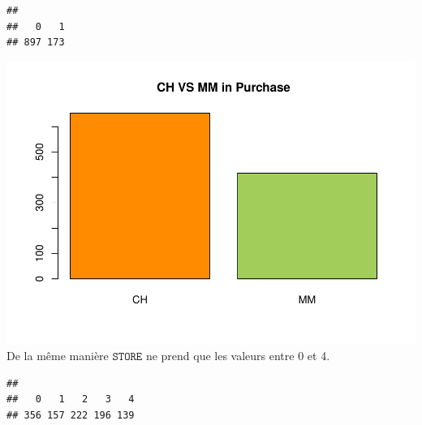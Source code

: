 \documentclass[]{article}
\newenvironment{Shaded}{\begin{snugshade}}{\end{snugshade}}
\newcommand{\KeywordTok}[1]{\textcolor[rgb]{0.13,0.29,0.53}{\textbf{#1}}}
\newcommand{\NormalTok}[1]{#1}
\newcommand{\OperatorTok}[1]{\textcolor[rgb]{0.81,0.36,0.00}{\textbf{#1}}}
\begin{document}
\begin{verbatim}
## 
##   0   1 
## 897 173
\end{verbatim}

\begin{Shaded}
\end{Shaded}

\includegraphics{durand_eltarr_files/figure-latex/unnamed-chunk-4-1.pdf}
De la même manière \(\texttt{STORE}\) ne prend que les valeurs entre 0
et 4.

\begin{Shaded}
\end{Shaded}

\begin{verbatim}
## 
##   0   1   2   3   4 
## 356 157 222 196 139
\end{verbatim}

\begin{Shaded}
\end{Shaded}
\end{document}
